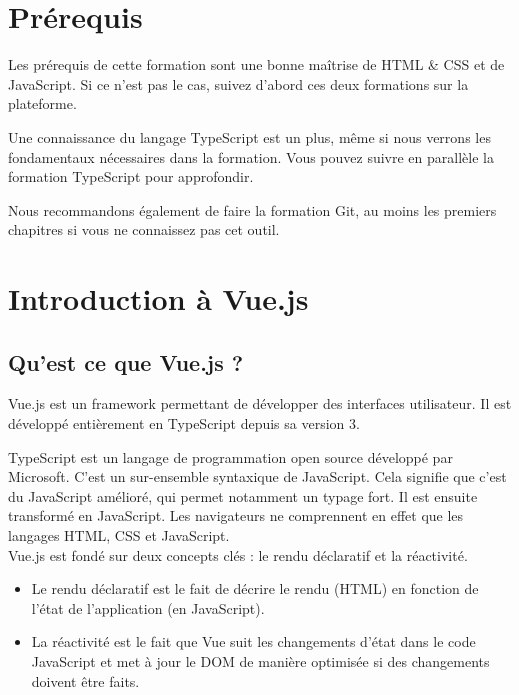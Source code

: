 \section{Prérequis}
Les prérequis de cette formation sont une bonne maîtrise de {\color{monOrange}HTML \& CSS} et de {\color{monOrange}JavaScript}. Si ce n'est pas le cas, suivez d'abord ces deux formations sur la plateforme.

Une connaissance du langage {\color{monOrange}TypeScript} est un plus, même si nous verrons les fondamentaux nécessaires dans la formation. Vous pouvez suivre en parallèle la formation {\color{monOrange}TypeScript} pour approfondir.

Nous recommandons également de faire la formation {\color{monOrange}Git}, au moins les premiers chapitres si vous ne connaissez pas cet outil.


\section{Introduction à Vue.js}
\subsection{Qu'est ce que Vue.js ?}
{\color{monOrange}Vue.js} est un framework permettant de développer des interfaces utilisateur. Il est développé entièrement en {\color{monOrange}TypeScript} depuis sa version 3.

{\color{monOrange}TypeScript} est un langage de programmation open source développé par {\color{monOrange}Microsoft}. C'est un sur-ensemble syntaxique de {\color{monOrange}JavaScript}. Cela signifie que c'est du {\color{monOrange}JavaScript} amélioré, qui permet notamment un typage fort. Il est ensuite transformé en {\color{monOrange}JavaScript}. Les navigateurs ne comprennent en effet que les langages {\color{monOrange}HTML}, {\color{monOrange}CSS} et {\color{monOrange}JavaScript}.
\\

Vue.js est fondé sur deux concepts clés : le rendu déclaratif et la réactivité.
\begin{itemize}
\item Le rendu déclaratif est le fait de décrire le rendu ({\color{monOrange}HTML}) en fonction de l'état de l'application (en {\color{monOrange}JavaScript}).
\item La réactivité est le fait que Vue suit les changements d'état dans le code {\color{monOrange}JavaScript} et met à jour le {\color{monOrange}DOM} de manière optimisée si des changements doivent être faits.
\end{itemize}


